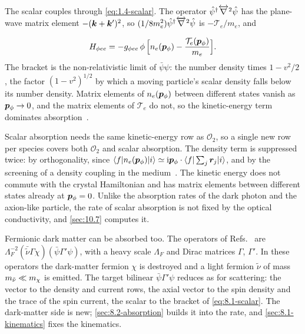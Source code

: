 The scalar couples through \cref{eq:1.4-scalar}. The operator $\hat{\psi}^\dagger\overleftrightarrow{\nabla}^2\hat{\psi}$ has the plane-wave matrix element $-(\bm{k} + \bm{k}')^2$, so $(1/8m_e^2)\hat{\psi}^\dagger\overleftrightarrow{\nabla}^2\hat{\psi}$ is $-\mathcal{T}_e/m_e$, and
\begin{keyresult}
\begin{equation}
  H_{\phi ee} = -g_{\phi ee}\,\phi\,\Bigl[n_e(\bm{p}_\phi) - \frac{\mathcal{T}_e(\bm{p}_\phi)}{m_e}\Bigr] .
  \label{eq:8.1-scalar}
\end{equation}
The bracket is the non-relativistic limit of $\bar\psi\psi$: the number density times $1 - v^2/2$, the factor $(1 - v^2)^{1/2}$ by which a moving particle's scalar density falls below its number density. Matrix elements of $n_e(\bm{p}_\phi)$ between different states vanish as $\bm{p}_\phi \to 0$, and the matrix elements of $\mathcal{T}_e$ do not, so the kinetic-energy term dominates absorption~\cite[Eq.~(18) and Sect.~III\,C]{mitridate2021dark}.
\end{keyresult}
\noindent Scalar absorption needs the same kinetic-energy row as $\mathcal{O}_2$, so a single new row per species covers both $\mathcal{O}_2$ and scalar absorption. The density term is suppressed twice: by orthogonality, since $\langle f|n_e(\bm{p}_\phi)|i\rangle \simeq \mathrm{i}\bm{p}_\phi\cdot\langle f|\sum_j\bm{r}_j|i\rangle$, and by the screening of a density coupling in the medium~\cite[Sect.~III\,C]{mitridate2021dark}. The kinetic energy does not commute with the crystal Hamiltonian and has matrix elements between different states already at $\bm{p}_\phi = 0$. Unlike the absorption rates of the dark photon and the axion-like particle, the rate of scalar absorption is not fixed by the optical conductivity, and \cref{sec:10.7} computes it.

Fermionic dark matter can be absorbed too. The operators of Refs.~\cites[Eq.~(1)]{dror2020direct}[Eqs.~(1) and (2)]{dror2021absorption} are $\Lambda_F^{-2}(\bar{\tilde\nu}\Gamma\chi)(\bar\psi\Gamma'\psi)$, with a heavy scale $\Lambda_F$ and Dirac matrices $\Gamma$, $\Gamma'$. In these operators the dark-matter fermion $\chi$ is destroyed and a light fermion $\tilde\nu$ of mass $m_{\tilde\nu} \ll m_{\chi}$ is emitted. The target bilinear $\bar\psi\Gamma'\psi$ reduces as for scattering: the vector to the density and current rows, the axial vector to the spin density and the trace of the spin current, the scalar to the bracket of \cref{eq:8.1-scalar}. The dark-matter side is new; \cref{sec:8.2-absorption} builds it into the rate, and \cref{sec:8.1-kinematics} fixes the kinematics.

